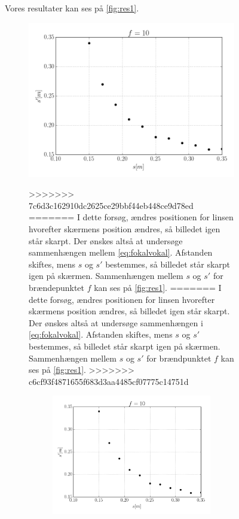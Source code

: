 \begin{table}[H]
\begin{figure}[H]
Vores resultater kan ses på \cref{fig:res1}.
\begin{figure}[H]
    \includegraphics[width=\linewidth]{res1.png}
    \caption{Resultater af forsøg 1}
>>>>>>> 7c6d3c162910dc2625ce29bbf44eb448ce9d78ed
=======
I dette forsøg, ændres positionen for linsen hvorefter skærmens position ændres, så billedet igen står skarpt. Der ønskes altså at undersøge sammenhængen mellem \cref{eq:fokalvokal}. Afstanden skiftes, mens $s$ og $s'$ bestemmes, så billedet står skarpt igen på skærmen.
Sammenhængen mellem $s$ og $s'$ for brændepunktet $f$ kan ses på \cref{fig:res1}.
=======
I dette forsøg, ændres positionen for linsen hvorefter skærmens position ændres, så billedet igen står skarpt. Der ønskes altså at undersøge sammenhængen i \cref{eq:fokalvokal}. Afstanden skiftes, mens $s$ og $s'$ bestemmes, så billedet står skarpt igen på skærmen.
Sammenhængen mellem $s$ og $s'$ for brændpunktet $f$ kan ses på \cref{fig:res1}.
>>>>>>> c6cf93f4871655f683d3aa4485cf07775c14751d
\begin{figure}[H]
    \includegraphics[width=\linewidth]{res1.png}

\end{figure}
\end{figure}
\end{figure}
\end{table}
